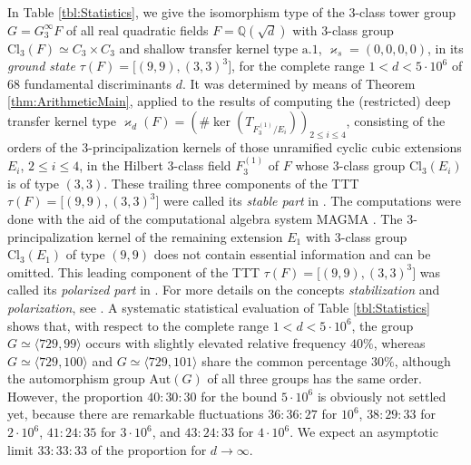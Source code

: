 \documentclass{amsart}
\theoremstyle{definition}
\numberwithin{equation}{section}
\begin{document}

In Table
\ref{tbl:Statistics},
we give the isomorphism type of the \(3\)-class tower group \(G=G_3^\infty{F}\)
of all real quadratic fields \(F=\mathbb{Q}(\sqrt{d})\)
with \(3\)-class group \(\mathrm{Cl}_3(F)\simeq C_3\times C_3\)
and shallow transfer kernel type \(\mathrm{a}.1\), \(\varkappa_s=(0,0,0,0)\),
in its \textit{ground state} \(\tau(F)=\lbrack (9,9),(3,3)^3\rbrack\),
for the complete range \(1<d<5\cdot 10^6\) of \(68\) fundamental discriminants \(d\).
It was determined by means of Theorem
\ref{thm:ArithmeticMain},
applied to the results of computing the (restricted) deep transfer kernel type
\(\varkappa_d(F)=(\#\ker(T_{F_3^{(1)}/E_i}))_{2\le i\le 4}\),
consisting of the orders of the \(3\)-principalization kernels
of those unramified cyclic cubic extensions \(E_i\), \(2\le i\le 4\),
in the Hilbert \(3\)-class field \(F_3^{(1)}\) of \(F\)
whose \(3\)-class group \(\mathrm{Cl}_3(E_i)\) is of type \((3,3)\).
These trailing three components of the TTT \(\tau(F)=\lbrack (9,9),(3,3)^3\rbrack\)
were called its \textit{stable part} in
\cite[Dfn. 5.5, p. 84]{Ma9}.
The computations were done with the aid of the computational algebra system MAGMA
\cite{MAGMA}.
The \(3\)-principalization kernel of the
remaining extension \(E_1\) with \(3\)-class group \(\mathrm{Cl}_3(E_1)\) of type \((9,9)\)
does not contain essential information and can be omitted.
This leading component of the TTT \(\tau(F)=\lbrack (9,9),(3,3)^3\rbrack\)
was called its \textit{polarized part} in
\cite[Dfn. 5.5, p. 84]{Ma9}.
For more details on the concepts \textit{stabilization} and \textit{polarization}, see
\cite[\S\ 6, pp. 90--95]{Ma9}.
A systematic statistical evaluation of Table 
\ref{tbl:Statistics}
shows that, with respect to the complete range \(1<d<5\cdot 10^6\),
the group \(G\simeq\langle 729,99\rangle\) occurs with slightly elevated relative frequency \(40\%\),
whereas \(G\simeq\langle 729,100\rangle\) and \(G\simeq\langle 729,101\rangle\) share the common percentage \(30\%\),
although the automorphism group \(\mathrm{Aut}(G)\) of all three groups has the same order.
However, the proportion \(40:30:30\) for the bound \(5\cdot 10^6\) is obviously not settled yet,
because there are remarkable fluctuations
\(36:36:27\) for \(10^6\),
\(38:29:33\) for \(2\cdot 10^6\),
\(41:24:35\) for \(3\cdot 10^6\), and
\(43:24:33\) for \(4\cdot 10^6\).
We expect an asymptotic limit \(33:33:33\) of the proportion for \(d\to\infty\).

\end{document}
